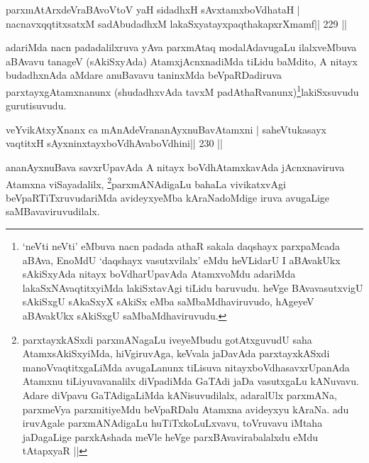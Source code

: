 
\begin{shl}
parxmAtArxdeVraBAvoV\s toV yaH sidadhxH sAvxtamxboVdhataH |
nacnavxqqtitxsatxM sadAbudadhxM lakaSxyatayxpaqthakapxrXmamf\hfill || 229 ||
\end{shl}

\begin{artha}
adariMda nacn padadalilxruva yAva parxmAtaq modalAdavugaLu
ilalxveMbuva aBAvavu tanageV (sAkiSxyAda) AtamxjAcnxnadiMda tiLidu
baMdito, A nitayx budadhxnAda aMdare anuBavavu taninxMda
beVpaRDadiruva parxtayxgAtamxnanunx (shudadhxvAda
tavxM padAthaRvanunx)\footnote{`neVti neVti' eMbuva nacn padada
  athaR sakala daqshayx parxpaMcada aBAva, EnoMdU `daqshayx
  vasutxvilalx' eMdu heVLidarU I aBAvakUkx sAkiSxyAda nitayx
  boVdharUpavAda AtamxvoMdu adariMda lakaSxNAvaqtitxyiMda lakiSxtavAgi
tiLidu baruvudu. heVge BAvavasutxvigU sAkiSxgU sAkaSxyX sAkiSx eMba
saMbaMdhaviruvudo, hAgeyeV aBAvakUkx sAkiSxgU saMbaMdhaviruvudu.}lakiSxsuvudu
gurutisuvudu.
\end{artha}


\begin{shl}
veYvikAtxyXnanx ca mAnAdeVrananAyxnuBavAtamxni |
saheVtukasayx vaqtitxH sAyxninxtayxboVdhAvaboVdhini\hfill || 230 ||
\end{shl}

\begin{artha}
ananAyxnuBava savxrUpavAda A nitayx boVdhAtamxkavAda jAcnxnaviruva
Atamxna viSayadalilx, \footnote{parxtayxkASxdi parxmANagaLu
  iveyeMbudu gotAtxguvudU saha AtamxsAkiSxyiMda, hiVgiruvAga, keVvala
jaDavAda parxtayxkASxdi manoVvaqtitxgaLiMda avugaLanunx tiLisuva
nitayxboVdhasavxrUpanAda Atamxnu tiLiyuvavanalilx diVpadiMda GaTAdi
jaDa vasutxgaLu kANuvavu. Adare diVpavu GaTAdigaLiMda kANisuvudilalx,
adaralUlx parxmANa, parxmeVya parxmitiyeMdu beVpaRDalu Atamxna
avideyxyu kAraNa. adu iruvAgale parxmANAdigaLu huTiTxkoLuLxvavu,
toVruvavu iMtaha jaDagaLige parxkAshada meVle heVge 
parxBAvavirabalalxdu eMdu tAtapxyaR ||}parxmANAdigaLu bahaLa vivikatxvAgi
beVpaRTiTxruvudariMda avideyxyeMba kAraNadoMdige iruva avugaLige
saMBavaviruvudilalx.
\end{artha}


